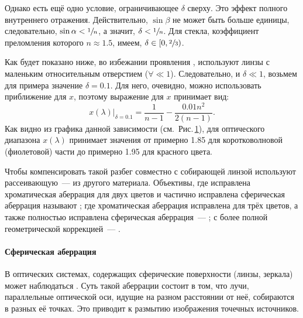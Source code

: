 Однако есть ещё одно условие, ограничивающее $\delta$ сверху. Это эффект полного внутреннего отражения. Действительно, $\sin \beta$ не может быть больше единицы, следовательно, $\sin \alpha < \sfrac{1}{n}$, а значит, $\delta < \sfrac{1}{n}$. Для стекла, коэффициент преломления которого $n \approx 1.5$, имеем, $\delta \in [0, \sfrac{2}{3})$.

\begin{figure}
	\centering
	\vspace{-1pc}
	\caption{}
	\label{pic:crown-dispersion-x}
\end{figure}
Как будет показано ниже, во избежании проявления , используют линзы с маленьким относительным отверстием ($\forall \ll 1$). Следовательно, и $\delta \ll 1$, возьмем для примера значение $\delta = 0.1$. Для него, очевидно, можно использовать приближение для $x$, поэтому выражение для $x$ принимает вид:
\begin{equation*}
	x(\lambda)|_{\delta = 0.1} = \frac{1}{n-1} - \frac{0.01 n^2}{2(n-1)}.
\end{equation*}
Как видно из графика данной зависимости (см.~Рис.\,\ref{pic:crown-dispersion-x}), для оптического диапазона $x(\lambda)$ принимает значения от примерно 1.85 для коротковолновой (фиолетовой) части до примерно 1.95 для красного цвета.

Чтобы компенсировать такой разбег совместно с собирающей линзой используют рассеивающую~--- из другого материала. Объективы, где исправлена хроматическая аберрация для двух цветов и частично исправлена сферическая аберрация называют ; где хроматическая аберрация исправлена для трёх цветов, а также полностью исправлена сферическая аберрация~--- ; с более полной геометрической коррекцией~--- .

\paragraph{Сферическая аберрация}
В оптических системах, содержащих сферические поверхности (линзы, зеркала) может наблюдаться . Суть такой аберрации состоит в том, что лучи, параллельные оптической оси, идущие на разном расстоянии от неё, собираются в разных её точках. Это приводит к размытию изображения точечных источников.

